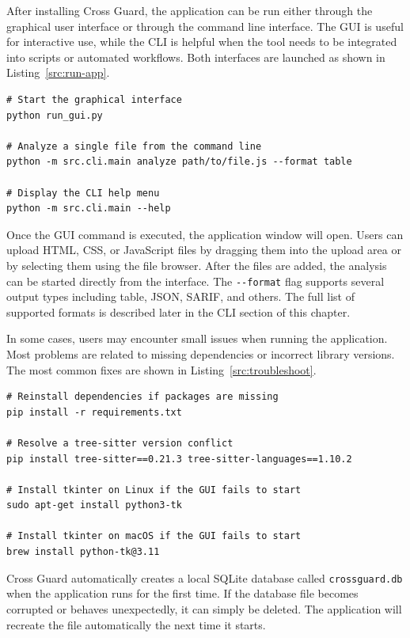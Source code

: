 After installing Cross Guard, the application can be run either through the graphical user interface or through the command line interface. The GUI is useful for interactive use, while the CLI is helpful when the tool needs to be integrated into scripts or automated workflows. Both interfaces are launched as shown in Listing~\ref{src:run-app}.

\begin{lstlisting}[caption={Launching Cross Guard and showing CLI help}, label=src:run-app, basicstyle=\ttfamily\small]
# Start the graphical interface
python run_gui.py

# Analyze a single file from the command line
python -m src.cli.main analyze path/to/file.js --format table

# Display the CLI help menu
python -m src.cli.main --help
\end{lstlisting}

Once the GUI command is executed, the application window will open. Users can upload HTML, CSS, or JavaScript files by dragging them into the upload area or by selecting them using the file browser. After the files are added, the analysis can be started directly from the interface. The \texttt{-{}-format} flag supports several output types including table, JSON, SARIF, and others. The full list of supported formats is described later in the CLI section of this chapter.

In some cases, users may encounter small issues when running the application. Most problems are related to missing dependencies or incorrect library versions. The most common fixes are shown in Listing~\ref{src:troubleshoot}.

\begin{lstlisting}[caption={Common troubleshooting commands}, label=src:troubleshoot, basicstyle=\ttfamily\small]
# Reinstall dependencies if packages are missing
pip install -r requirements.txt

# Resolve a tree-sitter version conflict
pip install tree-sitter==0.21.3 tree-sitter-languages==1.10.2

# Install tkinter on Linux if the GUI fails to start
sudo apt-get install python3-tk

# Install tkinter on macOS if the GUI fails to start
brew install python-tk@3.11
\end{lstlisting}

Cross Guard automatically creates a local SQLite database called \texttt{crossguard.db} when the application runs for the first time. If the database file becomes corrupted or behaves unexpectedly, it can simply be deleted. The application will recreate the file automatically the next time it starts.

